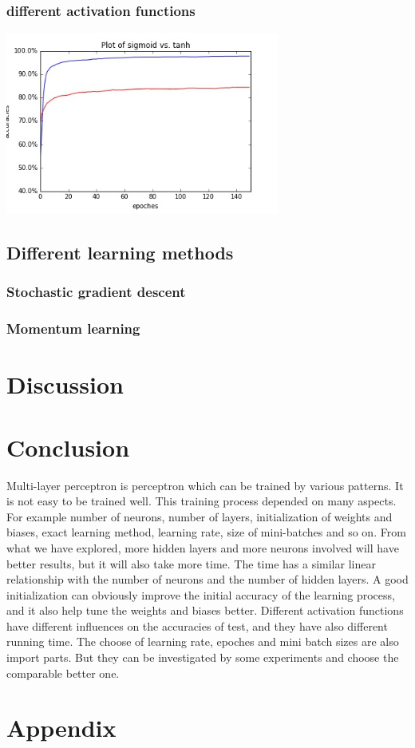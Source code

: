 \documentclass[12pt,a4paper]{article}
\begin{document}
\subsubsection{different activation functions}
\includegraphics[width=90mm,scale=1]{p301.jpg}\\


\subsection{Different learning methods}
\subsubsection{Stochastic gradient descent}
\subsubsection{Momentum learning}


\section{Discussion}


\section{Conclusion}
Multi-layer perceptron is perceptron which can be trained by various patterns. It is not easy to be trained well. This training process depended on many aspects. For example number of neurons, number of layers, initialization of weights and biases, exact learning method, learning rate, size of mini-batches and so on. 
From what we have explored, more hidden layers and more neurons involved will have better results, but it will also take more time. The time has a similar linear relationship with the number of neurons and the number of hidden layers. A good initialization can obviously improve the initial accuracy of the learning process, and it also help tune the weights and biases better. Different activation functions have different influences on the accuracies of test, and they have also different running time. The choose of learning rate, epoches and mini batch sizes are also import parts. But they can be investigated by some experiments and choose the comparable better one.

\newpage
\section{Appendix}
\end{document}
